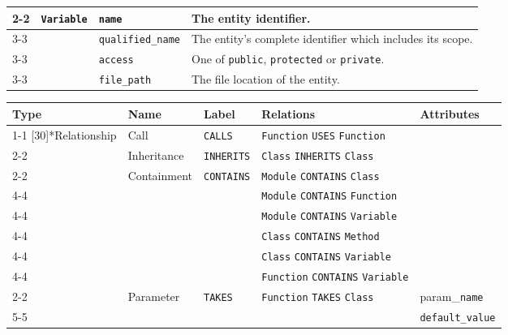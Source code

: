 \begin{tabularx}{\textwidth}{p{1.8cm}llX}
\cmidrule{2-2}\cmidrule{3-3}\cmidrule{4-4}
 & \multirow{4}[8]{*}{\texttt{Variable}} & \texttt{name} & The entity identifier. \\
\cmidrule{3-3}\cmidrule{4-4}
 &  & \texttt{qualified\_\texttt{name}} & The entity's complete identifier which includes its scope. \\
\cmidrule{3-3}\cmidrule{4-4}
 &  & \texttt{access} & One of \texttt{public}, \texttt{protected} or \texttt{private}. \\
\cmidrule{3-3}\cmidrule{4-4}
 &  & \texttt{file\_path} & The file location of the entity. \\
\bottomrule
\end{tabularx}

\begin{tabularx}{\textwidth}{p{1.8cm}llXl}
\toprule
\textbf{Type} & \textbf{Name} & \textbf{Label} & \textbf{Relations} & \textbf{Attributes} \\
\cmidrule{1-1}\cmidrule{2-2}\cmidrule{3-3}\cmidrule{4-4}\cmidrule{5-5}
\multirow{15}[30]{*}{Relationship} & Call & \texttt{CALLS} & \texttt{Function} \texttt{USES} \texttt{Function} &  \\
\cmidrule{2-2}\cmidrule{3-3}\cmidrule{4-4}\cmidrule{5-5}
 & Inheritance & \texttt{INHERITS} & \texttt{Class} \texttt{INHERITS} \texttt{Class} &  \\
\cmidrule{2-2}\cmidrule{3-3}\cmidrule{4-4}\cmidrule{5-5}
 & \multirow{6}[12]{*}{Containment} & \multirow{6}[12]{*}{\texttt{CONTAINS}} & \texttt{Module} \texttt{CONTAINS} \texttt{Class} &  \\
\cmidrule{4-4}\cmidrule{5-5}
 &  &  & \texttt{Module} \texttt{CONTAINS} \texttt{Function} &  \\
\cmidrule{4-4}\cmidrule{5-5}
 &  &  & \texttt{Module} \texttt{CONTAINS} \texttt{Variable} &  \\
\cmidrule{4-4}\cmidrule{5-5}
 &  &  & \texttt{Class} \texttt{CONTAINS} \texttt{Method} &  \\
\cmidrule{4-4}\cmidrule{5-5}
 &  &  & \texttt{Class} \texttt{CONTAINS} \texttt{Variable} &  \\
\cmidrule{4-4}\cmidrule{5-5}
 &  &  & \texttt{Function} \texttt{CONTAINS} \texttt{Variable} &  \\
\cmidrule{2-2}\cmidrule{3-3}\cmidrule{4-4}\cmidrule{5-5}
 & \multirow{2}[4]{*}{Parameter} & \multirow{2}[4]{*}{\texttt{TAKES}} & \multirow{2}[4]{*}{\texttt{Function} \texttt{TAKES} \texttt{Class}} & param\_\texttt{name} \\
\cmidrule{5-5}
 &  &  &  & \texttt{default\_value} \\

\end{tabularx}
